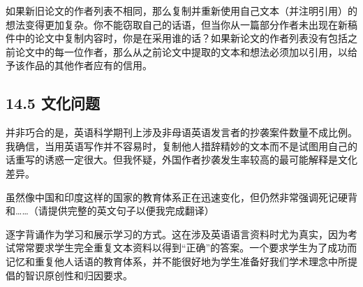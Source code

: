 如果新旧论文的作者列表不相同，那么复制并重新使用自己文本（并注明引用）的想法变得更加复杂。你不能窃取自己的话语，但当你从一篇部分作者未出现在新稿件中的论文中复制内容时，你是在采用谁的话？如果新论文的作者列表没有包括之前论文中的每一位作者，那么从之前论文中提取的文本和想法必须加以引用，以给予该作品的其他作者应有的信用。

\subsection*{14.5 文化问题}
并非巧合的是，英语科学期刊上涉及非母语英语发言者的抄袭案件数量不成比例。我确信，当用英语写作并不容易时，复制他人措辞精妙的文本而不是试图用自己的话重写的诱惑一定很大。但我怀疑，外国作者抄袭发生率较高的最可能解释是文化差异。

虽然像中国和印度这样的国家的教育体系正在迅速变化，但仍然非常强调死记硬背和……（请提供完整的英文句子以便我完成翻译）

逐字背诵作为学习和展示学习的方式。这在涉及英语语言资料时尤为真实，因为考试常常要求学生完全重复文本资料以得到“正确”的答案。一个要求学生为了成功而记忆和重复他人话语的教育体系，并不能很好地为学生准备好我们学术理念中所提倡的智识原创性和归因要求。


